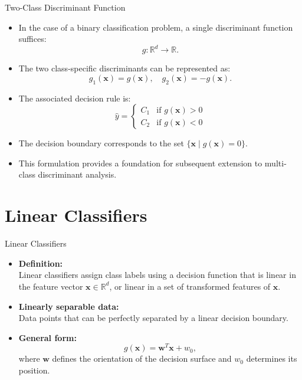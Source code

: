 \documentclass[serif, aspectratio=169]{beamer}
\begin{document}
    \begin{frame}{Two-Class Discriminant Function}
        \begin{itemize}
            \item In the case of a binary classification problem, a single discriminant function suffices:
            \[
                g : \mathbb{R}^d \rightarrow \mathbb{R}.
            \]
            \item The two class-specific discriminants can be represented as:
            \[
                g_1(\mathbf{x}) = g(\mathbf{x}), \quad g_2(\mathbf{x}) = -g(\mathbf{x}).
            \]
            \item The associated decision rule is:
            \[
                \hat{y} =
                \begin{cases}
                    C_1 & \text{if } g(\mathbf{x}) > 0 \\
                    C_2 & \text{if } g(\mathbf{x}) < 0
                \end{cases}
            \]
            \item The decision boundary corresponds to the set $\{\mathbf{x} \mid g(\mathbf{x}) = 0\}$.
            \item This formulation provides a foundation for subsequent extension to multi-class discriminant analysis.
        \end{itemize}
    \end{frame}



    \section{Linear Classifiers}

    \begin{frame}{Linear Classifiers}
        \begin{itemize}\itemsep1.5em
        \item \justifying \textbf{Definition:}\\
        Linear classifiers assign class labels using a decision function that is linear in the feature vector $\mathbf{x} \in \mathbb{R}^d$, or linear in a set of transformed features of $\mathbf{x}$.
        \item \justifying \textbf{Linearly separable data:}\\
        Data points that can be perfectly separated by a linear decision boundary.
        \item \textbf{General form:}
        \[
            g(\mathbf{x}) = \mathbf{w}^T \mathbf{x} + w_0,
        \]
        where $\mathbf{w}$ defines the orientation of the decision surface and $w_0$ determines its position.
        \end{itemize}
    \end{frame}
\end{document}
